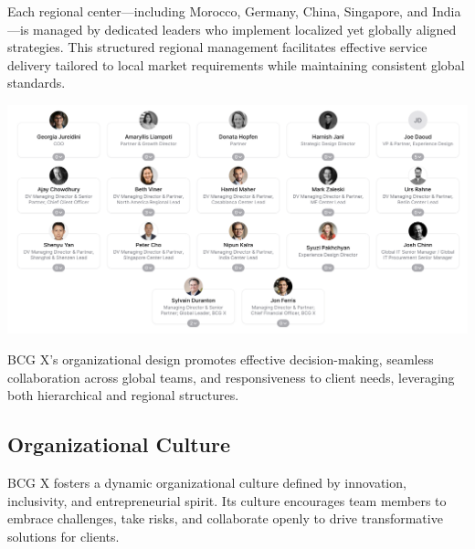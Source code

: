 Each regional center—including Morocco, Germany, China, Singapore, and India—is managed by dedicated leaders who implement localized yet globally aligned strategies. This structured regional management facilitates effective service delivery tailored to local market requirements while maintaining consistent global standards.

\begin{center}
    \includegraphics[width=\linewidth]{Images/Executive Leadership Board.png}
    \cite{executive_leadership_board}
    \label{fig:executive_leadership_board}
\end{center}
\noindent
\mynewline
BCG X’s organizational design promotes effective decision-making, seamless collaboration across global teams, and responsiveness to client needs, leveraging both hierarchical and regional structures.

\subsection{Organizational Culture}
BCG X fosters a dynamic organizational culture defined by innovation, inclusivity, and entrepreneurial spirit. Its culture encourages team members to embrace challenges, take risks, and collaborate openly to drive transformative solutions for clients.\mynewline

